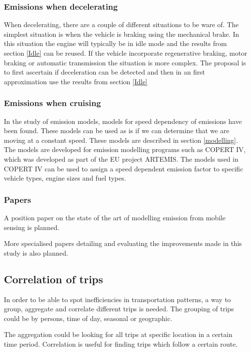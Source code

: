 \subsubsection{Emissions when decelerating}
When decelerating, there are a couple of different situations to be ware of. The simplest situation is when the vehicle is braking using the mechanical brake. In this situation the engine will typically be in idle mode and the results from section \ref{Idle} can be reused. If the vehicle incorporate regenerative braking, motor braking or automatic transmission the situation is more complex. The proposal is to first ascertain if deceleration can be detected and then in an first approximation use the results from section \ref{Idle}

\subsubsection{Emissions when cruising}
In the study of emission models, models for speed dependency of emissions have been found. These models can be used as is if we can determine that we are moving at a constant speed. These models are described in section \ref{modelling}. The models are developed for emission modelling programs such as COPERT IV, which was developed as part of the EU project ARTEMIS. The models used in COPERT IV can be used to assign a speed dependent emission factor to specific vehicle types, engine sizes and fuel types.
 
\subsubsection{Papers}
A position paper on the state of the art of modelling emission from mobile sensing is planned.

More specialised papers detailing and evaluating the improvements made in this study is also planned.

\subsection{Correlation of trips}
In order to be able to spot inefficiencies in transportation patterns, a way to group, aggregate and correlate different trips is needed. The grouping of trips could be by persons, time of day, seasonal or geographic. 

The aggregation could be looking for all trips at specific location in a certain time period. Correlation is useful for finding trips which follow a certain route.

